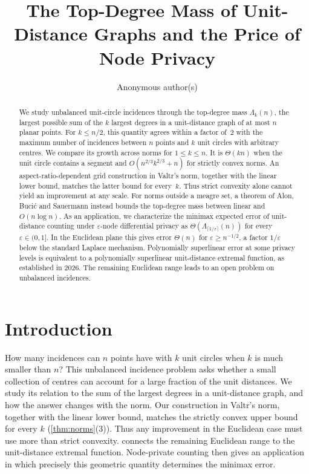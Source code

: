 \documentclass[anonymous,a4paper,USenglish,cleveref,autoref,thm-restate]{socg-lipics-v2021}
\title{The Top-Degree Mass of Unit-Distance Graphs and the Price of Node Privacy}
\author{Anonymous author(s)}{Anonymous affiliation}{}{}{}
\newcommand{\eps}{\varepsilon}
\newcommand{\Lam}{\Lambda}
\begin{document}
\maketitle

\begin{abstract}
We study unbalanced unit-circle incidences through the top-degree mass $\Lam_k(n)$, the largest possible sum of the $k$ largest degrees in a unit-distance graph of at most $n$ planar points. For $k\le n/2$, this quantity agrees within a factor of~$2$ with the maximum number of incidences between $n$ points and $k$ unit circles with arbitrary centres. We compare its growth across norms for $1\le k\le n$. It is $\Theta(kn)$ when the unit circle contains a segment and $O(n^{2/3}k^{2/3}+n)$ for strictly convex norms. An aspect-ratio-dependent grid construction in Valtr's norm, together with the linear lower bound, matches the latter bound for every~$k$. Thus strict convexity alone cannot yield an improvement at any scale. For norms outside a meagre set, a theorem of Alon, Buci\'c and Sauermann instead bounds the top-degree mass between linear and $O(n\log n)$.
As an application, we characterize the minimax expected error of unit-distance counting under $\eps$-node differential privacy as $\Theta(\Lam_{\lceil1/\eps\rceil}(n))$ for every $\eps\in(0,1]$. In the Euclidean plane this gives error $\Theta(n)$ for $\eps\ge n^{-1/2}$, a factor $1/\eps$ below the standard Laplace mechanism. Polynomially superlinear error at some privacy levels is equivalent to a polynomially superlinear unit-distance extremal function, as established in 2026. The remaining Euclidean range leads to an open problem on unbalanced incidences.
\end{abstract}

\section{Introduction}
\label{sec:intro}

How many incidences can $n$ points have with $k$ unit circles when $k$ is much smaller than $n$? This unbalanced incidence problem asks whether a small collection of centres can account for a large fraction of the unit distances. We study its relation to the sum of the largest degrees in a unit-distance graph, and how the answer changes with the norm. Our construction in Valtr's norm, together with the linear lower bound, matches the strictly convex upper bound for every $k$ (\cref{thm:norms}(3)). Thus any improvement in the Euclidean case must use more than strict convexity.  connects the remaining Euclidean range to the unit-distance extremal function. Node-private counting then gives an application in which precisely this geometric quantity determines the minimax error.
\end{document}
